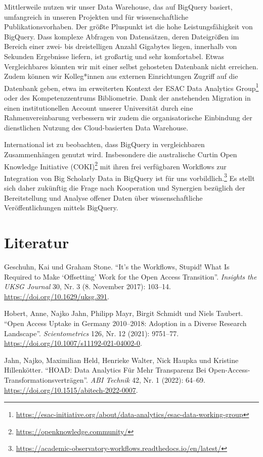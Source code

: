 \documentclass[a4paper,
fontsize=11pt,
oneside,
numbers=noperiodatend,
parskip=half-,
bibliography=totoc,
final
]{scrartcl}
\begin{document}
Mittlerweile nutzen wir unser Data Warehouse, das auf BigQuery basiert,
umfangreich in unseren Projekten und für wissenschaftliche
Publikationsvorhaben. Der größte Pluspunkt ist die hohe
Leistungsfähigkeit von BigQuery. Dass komplexe Abfragen von Datensätzen,
deren Dateigrößen im Bereich einer zwei- bis dreistelligen Anzahl
Gigabytes liegen, innerhalb von Sekunden Ergebnisse liefern, ist
großartig und sehr komfortabel. Etwas Vergleichbares könnten wir mit
einer selbst gehosteten Datenbank nicht erreichen. Zudem können wir
Kolleg*innen aus externen Einrichtungen Zugriff auf die Datenbank geben,
etwa im erweiterten Kontext der ESAC Data Analytics Group\footnote{\url{https://esac-initiative.org/about/data-analytics/esac-data-working-group}}
oder des Kompetenzzentrums Bibliometrie. Dank der anstehenden Migration
in einen institutionellen Account unserer Universität durch eine
Rahmenvereinbarung verbessern wir zudem die organisatorische Einbindung
der dienstlichen Nutzung des Cloud-basierten Data Warehouse.

International ist zu beobachten, dass BigQuery in vergleichbaren
Zusammenhängen genutzt wird. Insbesondere die australische Curtin Open
Knowledge Initiative (COKI)\footnote{\url{https://openknowledge.community/}}
mit ihren frei verfügbaren Workflows zur Integration von Big Scholarly
Data in BigQuery ist für uns vorbildlich.\footnote{\url{https://academic-observatory-workflows.readthedocs.io/en/latest/}}
Es stellt sich daher zukünftig die Frage nach Kooperation und Synergien
bezüglich der Bereitstellung und Analyse offener Daten über
wissenschaftliche Veröffentlichungen mittels BigQuery.

\hypertarget{literatur}{%
\section{Literatur}\label{literatur}}

Geschuhn, Kai und Graham Stone. \enquote{It's the Workflows, Stupid!
What Is Required to Make \enquote*{Offsetting} Work for the Open Access
Transition}. \emph{Insights the UKSG Journal} 30, Nr. 3 (8. November
2017): 103--14. \url{https://doi.org/10.1629/uksg.391}.

Hobert, Anne, Najko Jahn, Philipp Mayr, Birgit Schmidt und Niels
Taubert. \enquote{Open Access Uptake in Germany 2010--2018: Adoption in
a Diverse Research Landscape}. \emph{Scientometrics} 126, Nr. 12 (2021):
9751--77. \url{https://doi.org/10.1007/s11192-021-04002-0}.

Jahn, Najko, Maximilian Held, Henrieke Walter, Nick Haupka und Kristine
Hillenkötter. \enquote{HOAD: Data Analytics Für Mehr Transparenz Bei
Open-Access-Transformationsverträgen}. \emph{ABI Technik} 42, Nr. 1
(2022): 64--69. \url{https://doi.org/10.1515/abitech-2022-0007}.
\end{document}
